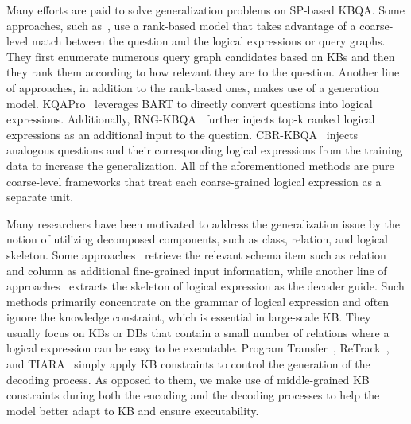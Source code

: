 Many efforts are paid to solve generalization problems on SP-based KBQA. Some approaches, such as~\cite{lan2020query,gu2021beyond}, use a rank-based model that takes advantage of a coarse-level match between the question and the logical expressions or query graphs. They first enumerate numerous query graph candidates based on KBs and then they rank them according to how relevant they are to the question. Another line of approaches, in addition to the rank-based ones, makes use of a generation model. KQAPro~\cite{cao2022kqa} leverages BART to directly convert questions into logical expressions. Additionally, RNG-KBQA~\cite{ye2022rng} further injects top-k ranked logical expressions as an additional input to the question. CBR-KBQA~\cite{das2021case} injects analogous questions and their corresponding logical expressions from the training data to increase the generalization. All of the aforementioned methods are pure coarse-level frameworks that treat each coarse-grained logical expression as a separate unit. 

Many researchers have been motivated to address the generalization issue by the notion of utilizing decomposed components, such as class, relation, and logical skeleton.
Some approaches~\cite{wang-etal-2020-rat,zhao-etal-2022-bridging,li2022resdsql} retrieve the relevant schema item such as relation and column as additional fine-grained input information, while another line of approaches~\cite{dong-lapata-2018-coarse} extracts the skeleton of logical expression as the decoder guide. Such methods primarily concentrate on the grammar of logical expression and often ignore the knowledge constraint, which is essential in large-scale KB. They usually focus on KBs or DBs that contain a small number of relations where a logical expression can be easy to be executable. Program Transfer~\cite{cao-etal-2022-program}, ReTrack~\cite{chen-etal-2021-retrack}, and TIARA~\cite{shu2022tiara} simply apply KB constraints to control the generation of the decoding process. As opposed to them, we make use of middle-grained KB constraints during both the encoding and the decoding processes to help the model better adapt to KB and ensure executability. 

